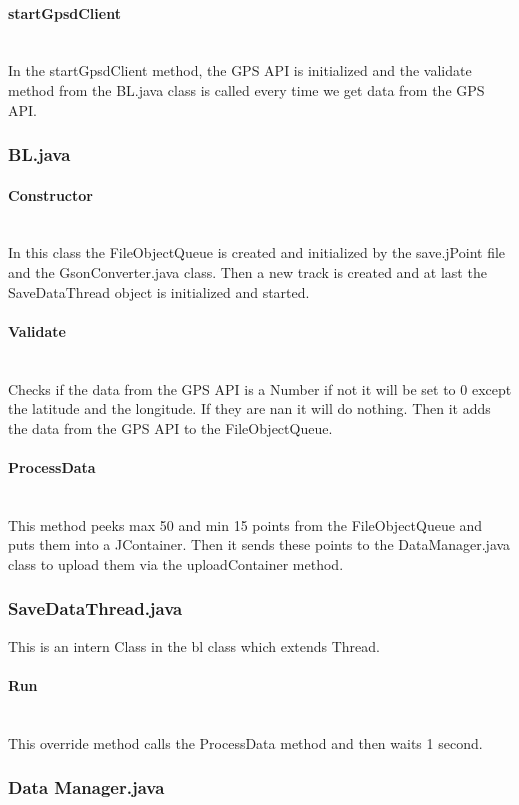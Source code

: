 \paragraph{startGpsdClient}\mbox{}\\
In the startGpsdClient method, the GPS API is initialized and the validate method from the BL.java class is called every time we get data from the GPS API.
\subsubsection{BL.java}
\paragraph{Constructor}\mbox{}\\
In this class the FileObjectQueue is created and initialized by the save.jPoint file and the GsonConverter.java class. 
Then a new track is created and at last the SaveDataThread object is initialized and started.
\paragraph{Validate}\mbox{}\\
Checks if the data from the GPS API is a Number if not it will be set to 0 except the latitude and the longitude. If they are \gls{nan} it will do nothing. 
Then it adds the data from the GPS API to the FileObjectQueue.
\paragraph{ProcessData}\mbox{}\\
This method peeks max 50 and min 15 points from the FileObjectQueue and puts them into a JContainer. Then it sends these points to the DataManager.java class to upload them via the uploadContainer method.
\subsubsection{SaveDataThread.java}
This is an intern Class in the \gls{bl} class which extends Thread.
\paragraph{Run}\mbox{}\\
This override method calls the ProcessData method and then waits 1 second.
\subsubsection{Data Manager.java}

